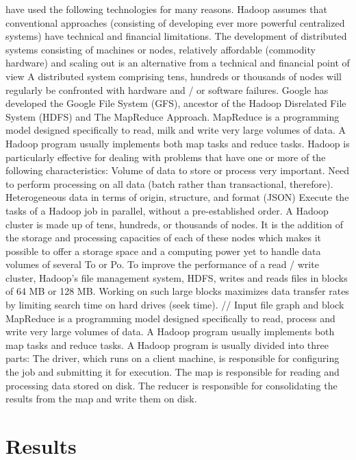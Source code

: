 \documentclass{acmtog} %
\begin{document}
\We have used the following technologies for many reasons. Hadoop assumes that conventional approaches (consisting of developing ever more powerful centralized systems) have technical and financial limitations. The development of distributed systems consisting of machines or nodes, relatively affordable (commodity hardware) and scaling out is an alternative from a technical and financial point of view A distributed system comprising tens, hundreds or thousands of nodes will regularly be confronted with hardware and / or software failures. Google has developed the Google File System (GFS), ancestor of the Hadoop Disrelated File System (HDFS) and The MapReduce Approach. MapReduce is a programming model designed specifically to read, milk and write very large volumes of data. A Hadoop program usually implements both map tasks and reduce tasks.
Hadoop is particularly effective for dealing with problems that have one or more of the following characteristics: Volume of data to store or process very important. Need to perform processing on all data (batch rather than transactional, therefore). Heterogeneous data in terms of origin, structure, and format (JSON) Execute the tasks of a Hadoop job in parallel, without a pre-established order. A Hadoop cluster is made up of tens, hundreds, or thousands of nodes. It is the addition of the storage and processing capacities of each of these nodes which makes it possible to offer a storage space and a computing power yet to handle data volumes of several To or Po. To improve the performance of a read / write cluster, Hadoop’s file management system, HDFS, writes and reads files in blocks of 64 MB or 128 MB. Working on such large blocks maximizes data transfer rates by limiting search time on hard drives (seek time). // Input file graph and block MapReduce is a programming model designed specifically to read, process and write very large volumes of data. A Hadoop program usually implements both map tasks and reduce tasks. A Hadoop program is usually divided into three parts: The driver, which runs on a client machine, is responsible for configuring the job and submitting it for execution. The map is responsible for reading and processing data stored on disk. The reducer is responsible for consolidating the results from the map and write them on disk.

\section{Results}
\label{sub:results}
\end{document}
